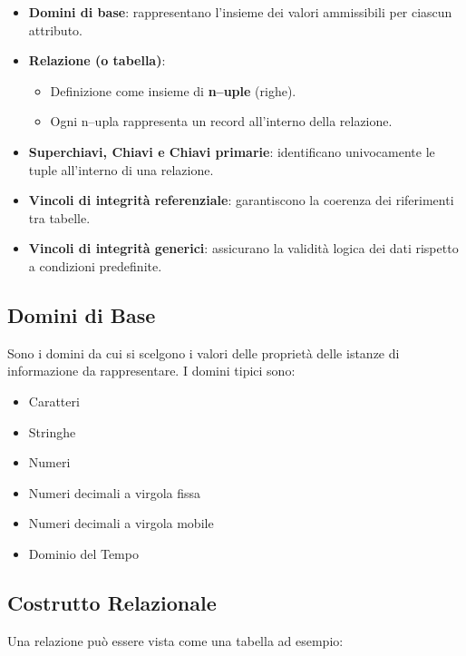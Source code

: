 \begin{itemize}
    \item \textbf{Domini di base}: rappresentano l’insieme dei valori ammissibili per ciascun attributo.
    \item \textbf{Relazione (o tabella)}:
    \begin{itemize}
        \item Definizione come insieme di \textbf{n–uple} (righe).
        \item Ogni n–upla rappresenta un record all’interno della relazione.
    \end{itemize}
    \item \textbf{Superchiavi, Chiavi e Chiavi primarie}: identificano univocamente le tuple all’interno di una relazione.
    \item \textbf{Vincoli di integrità referenziale}: garantiscono la coerenza dei riferimenti tra tabelle.
    \item \textbf{Vincoli di integrità generici}: assicurano la validità logica dei dati rispetto a condizioni predefinite.
\end{itemize}
\subsection{Domini di Base}
Sono i domini da cui si scelgono i valori delle proprietà delle
istanze di informazione da rappresentare. I domini tipici sono:
\begin{itemize}
    \item Caratteri
    \item Stringhe
    \item Numeri
    \item Numeri decimali a virgola fissa
    \item Numeri decimali a virgola mobile
    \item Dominio del Tempo
\end{itemize}
\subsection{Costrutto Relazionale}
Una relazione può essere vista come una tabella ad esempio:

